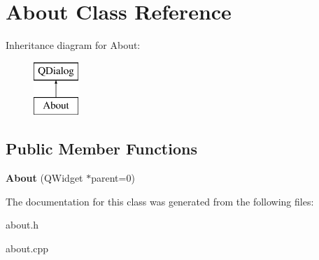 \hypertarget{classAbout}{\section{About Class Reference}
\label{classAbout}
}
Inheritance diagram for About\-:\begin{figure}[H]
\begin{center}
\leavevmode
\includegraphics[height=2.000000cm]{classAbout}
\end{center}
\end{figure}
\subsection*{Public Member Functions}
\begin{DoxyCompactItemize}
\item 
\hypertarget{classAbout_ab79599ebbcdeffe0a96e00f010e64177}{{\bfseries About} (Q\-Widget $\ast$parent=0)}\label{classAbout_ab79599ebbcdeffe0a96e00f010e64177}

\end{DoxyCompactItemize}


The documentation for this class was generated from the following files\-:\begin{DoxyCompactItemize}
\item 
about.\-h\item 
about.\-cpp\end{DoxyCompactItemize}
